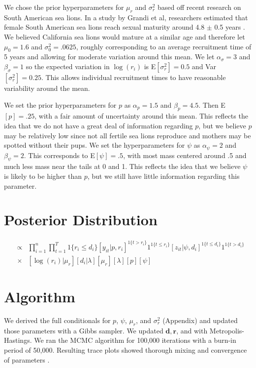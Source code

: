 \documentclass[12pt, a4paper]{article}
\begin{document}
We chose the prior hyperparameters for $\mu_r$ and $\sigma_r^2$ based off recent research on South American sea lions. In a study by Grandi et al, researchers estimated that female South American sea lions reach sexual maturity around 4.8 $\pm$ 0.5 years \cite{Grandi}. We believed California sea lions would mature at a similar age and therefore let $\mu_0 = 1.6$ and $\sigma_0^2 = .0625$, roughly corresponding to an average recruitment time of 5 years and allowing for moderate variation around this mean. We let $\alpha_{\sigma} = 3$ and $\beta_{\sigma} = 1$ so the expected variation in $\log(r_i)$ is E$[\sigma_r^2] = 0.5$ and Var$[\sigma_r^2] = 0.25$. This allows individual recruitment times to have reasonable variability around the mean. 

We set the prior hyperparameters for $p$ as $\alpha_p = 1.5$ and $\beta_p = 4.5$. Then E$[p] = .25$, with a fair amount of uncertainty around this mean. This reflects the idea that we do not have a great deal of information regarding $p$, but we believe $p$ may be relatively low since not all fertile sea lions reproduce and mothers may be spotted without their pups. We set the hyperparameters for $\psi$ as $\alpha_{\psi} = 2$ and $\beta_{\psi} = 2$. This corresponds to E$[\psi] = .5$, with most mass centered around .5 and much less mass near the tails at 0 and 1. This reflects the idea that we believe $\psi$ is likely to be higher than $p$, but we still have little information regarding this parameter.  

\section{Posterior Distribution}

\begin{eqnarray*}
[\log (\mathbf{r}), \mu_r, p, \mathbf{d}, \lambda, \psi | \mathbf{z}, \mathbf{y} ] & \propto & \prod_{i=1}^n \prod_{t=1} ^T  1\{r_i \leq d_i \} [y_{it}|p,r_i]^{1\{ t > r_i \}} 1^{1\{ t \leq r_i \}} [z_{it}|\psi, d_i]^{1 \{ t \leq d_i\} } 1^{1 \{ t > d_i\}} \\
  & \times & [\log(r_i)|\mu_r][d_i|\lambda]  [\mu_r][\lambda][p][\psi]
\end{eqnarray*}


\section{Algorithm}

We derived the full conditionals for $p$, $\psi$, $\mu_r$, and $\sigma_r^2$ (Appendix) and updated those parameters with a Gibbs sampler. We updated $\mathbf{d}, \mathbf{r}$, and with Metropolis-Hastings. We ran the MCMC algorithm for 100,000 iterations with a burn-in period of 50,000. Resulting trace plots showed thorough mixing and convergence of parameters . 
\end{document}
